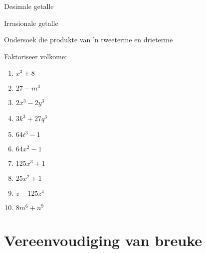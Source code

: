\begin{Aktiwiteit}{Desimale getalle}
\begin{aktiwiteit}{Irrasionale getalle}
\begin{aktiwiteit}{Ondersoek die produkte van 'n tweeterme en drieterme}
\begin{exercises}{}
{Faktoriseer volkome:
\begin{multicols}{2}
\begin{enumerate}[itemsep=5pt, label=\textbf{\arabic*}. ] 
\item ${x}^{3}+8$
\item $27-m^{3}$
\item $2x^{3}-2y^{3}$
\item $3k^{3} + 27q^{3}$
\item $64t^{3}-1$
\item $64x^{2} -1$
\item $125x^{3} +1$
\item $25x^{2} +1$
\item $z-125z^4{}$
\item $8m^{6} + n^{9}$
\end{enumerate}
\end{multicols}

}
\end{exercises}

\section{Vereenvoudiging van breuke}
\nopagebreak


\end{aktiwiteit}
\end{aktiwiteit}
\end{Aktiwiteit}
